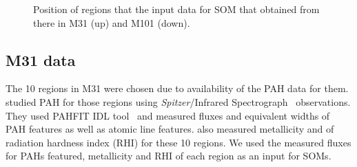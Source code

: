   \begin{figure}
    \hfill
    \caption{Position of regions that the input data for SOM that obtained from there in M31 (up) and M101 (down).}
    \label{fig:dummy}
  \end{figure}

    \subsection{M31 data}
     \label{Sec: data_M31_SOMN} 
     
     The 10 regions in M31 were chosen due to availability of the PAH data for them. 
     \cite{Dim15} studied PAH for those regions using {\it Spitzer}/Infrared Spectrograph~\citep[IRS,][]{Houck04b} observations. 
     They used {\sc PAHFIT IDL} tool~\citep{Smith07b} and measured fluxes and equivalent widths of PAH features as well as atomic line features.
     \cite{Dim15} also measured metallicity and of radiation hardness index (RHI) for these 10 regions.
     We used the measured fluxes for PAHs featured, metallicity and RHI of each region as an input for SOMs.
     
